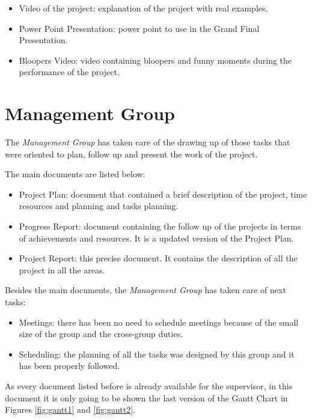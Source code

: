 \documentclass[11pt,a4paper,english]{book}  %
\theoremstyle{definition}  %
\theoremstyle{plain}  %
\theoremstyle{remark}  %
\begin{document}
\begin{itemize}
\item Video of the project: explanation of the project with real examples.
\item Power Point Presentation: power point to use in the Grand Final Presentation.
\item Bloopers Video: video containing bloopers and funny moments during the performance of the project.
\end{itemize}

	\section{Management Group}

The \textit{Management Group} has taken care of the drawing up of those tasks that were oriented to plan, follow up and present the work of the project.

The main documents are listed below:

\begin{itemize}
\item Project Plan: document that contained a brief description of the project, time resources and planning and tasks planning.
\item Progress Report: document containing the follow up of the projects in terms of achievements and resources. It is a updated version of the Project Plan.
\item Project Report: this precise document. It contains the description of all the project in all the areas.
\end{itemize}

Besides the main documents, the \textit{Management Group} has taken care of next tasks:

\begin{itemize}
\item Meetings: there has been no need to schedule meetings because of the small size of the group and the cross-group duties.
\item  Scheduling: the planning of all the tasks was designed by this group and it has been properly followed.
\end{itemize}

As every document listed before is already available for the supervisor, in this document it is only going to be shown the last version of the Gantt Chart in Figures \ref{fig:gantt1} and \ref{fig:gantt2}.
\end{document}
